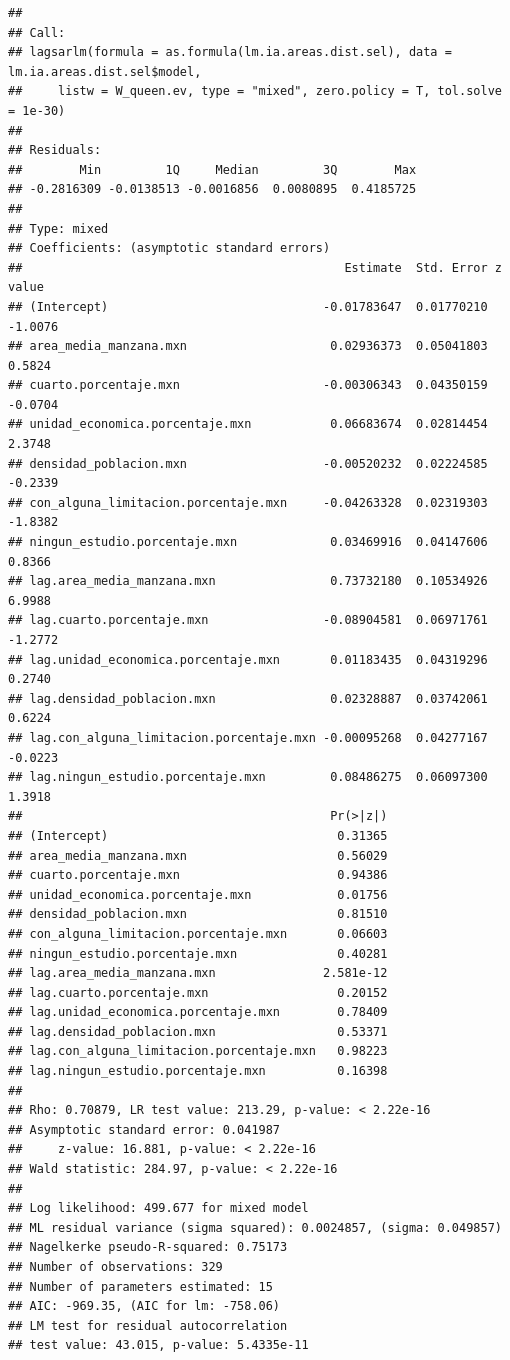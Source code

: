 \documentclass[12pt,]{book}
\begin{document}
\begin{verbatim}
## 
## Call:
## lagsarlm(formula = as.formula(lm.ia.areas.dist.sel), data = lm.ia.areas.dist.sel$model, 
##     listw = W_queen.ev, type = "mixed", zero.policy = T, tol.solve = 1e-30)
## 
## Residuals:
##        Min         1Q     Median         3Q        Max 
## -0.2816309 -0.0138513 -0.0016856  0.0080895  0.4185725 
## 
## Type: mixed 
## Coefficients: (asymptotic standard errors) 
##                                             Estimate  Std. Error z value
## (Intercept)                              -0.01783647  0.01770210 -1.0076
## area_media_manzana.mxn                    0.02936373  0.05041803  0.5824
## cuarto.porcentaje.mxn                    -0.00306343  0.04350159 -0.0704
## unidad_economica.porcentaje.mxn           0.06683674  0.02814454  2.3748
## densidad_poblacion.mxn                   -0.00520232  0.02224585 -0.2339
## con_alguna_limitacion.porcentaje.mxn     -0.04263328  0.02319303 -1.8382
## ningun_estudio.porcentaje.mxn             0.03469916  0.04147606  0.8366
## lag.area_media_manzana.mxn                0.73732180  0.10534926  6.9988
## lag.cuarto.porcentaje.mxn                -0.08904581  0.06971761 -1.2772
## lag.unidad_economica.porcentaje.mxn       0.01183435  0.04319296  0.2740
## lag.densidad_poblacion.mxn                0.02328887  0.03742061  0.6224
## lag.con_alguna_limitacion.porcentaje.mxn -0.00095268  0.04277167 -0.0223
## lag.ningun_estudio.porcentaje.mxn         0.08486275  0.06097300  1.3918
##                                           Pr(>|z|)
## (Intercept)                                0.31365
## area_media_manzana.mxn                     0.56029
## cuarto.porcentaje.mxn                      0.94386
## unidad_economica.porcentaje.mxn            0.01756
## densidad_poblacion.mxn                     0.81510
## con_alguna_limitacion.porcentaje.mxn       0.06603
## ningun_estudio.porcentaje.mxn              0.40281
## lag.area_media_manzana.mxn               2.581e-12
## lag.cuarto.porcentaje.mxn                  0.20152
## lag.unidad_economica.porcentaje.mxn        0.78409
## lag.densidad_poblacion.mxn                 0.53371
## lag.con_alguna_limitacion.porcentaje.mxn   0.98223
## lag.ningun_estudio.porcentaje.mxn          0.16398
## 
## Rho: 0.70879, LR test value: 213.29, p-value: < 2.22e-16
## Asymptotic standard error: 0.041987
##     z-value: 16.881, p-value: < 2.22e-16
## Wald statistic: 284.97, p-value: < 2.22e-16
## 
## Log likelihood: 499.677 for mixed model
## ML residual variance (sigma squared): 0.0024857, (sigma: 0.049857)
## Nagelkerke pseudo-R-squared: 0.75173 
## Number of observations: 329 
## Number of parameters estimated: 15 
## AIC: -969.35, (AIC for lm: -758.06)
## LM test for residual autocorrelation
## test value: 43.015, p-value: 5.4335e-11
\end{verbatim}
\end{document}
